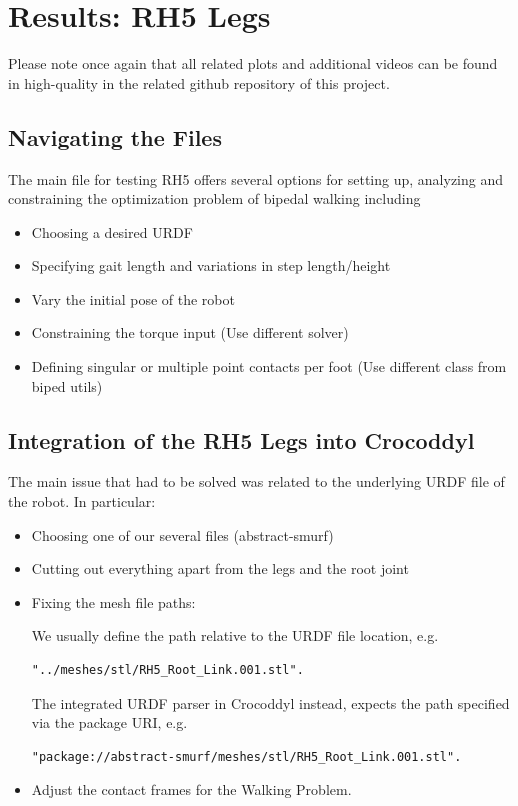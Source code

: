   
  
\section{Results: RH5 Legs}
Please note once again that all related plots and additional videos can be found in high-quality in the related github repository \cite{julesserOCFrameworks} of this project.
\subsection{Navigating the Files}
The main file for testing RH5 offers several options for setting up, analyzing and constraining the optimization problem of bipedal walking including
\begin{itemize}
\item Choosing a desired URDF 
\item Specifying gait length and variations in step length/height
\item Vary the initial pose of the robot
\item Constraining the torque input (Use different solver)
\item Defining singular or multiple point contacts per foot (Use different class from biped utils)
\end{itemize}

\subsection{Integration of the RH5 Legs into Crocoddyl}
The main issue that had to be solved was related to the underlying URDF file of the robot. In particular: 
\begin{itemize}
\item Choosing one of our several files (abstract-smurf)
\item Cutting out everything apart from the legs and the root joint
\item Fixing the mesh file paths: 

We usually define the path relative to the URDF file location, e.g.
\begin{verbatim}
"../meshes/stl/RH5_Root_Link.001.stl".
\end{verbatim}
The integrated URDF parser in Crocoddyl instead, expects the path specified via the package URI, e.g. 
\begin{verbatim}
"package://abstract-smurf/meshes/stl/RH5_Root_Link.001.stl".
\end{verbatim}
\item Adjust the contact frames for the Walking Problem.
\end{itemize}


